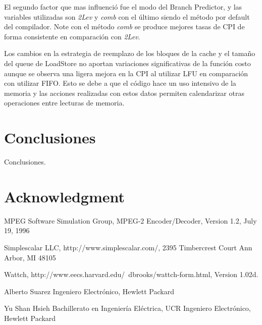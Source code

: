 \documentclass[journal]{IEEEtran}
\begin{document}
El segundo factor que mas influenci\'{o} fue el modo del Branch Predictor, y las variables utilizadas son \textit{2Lev} y \textit{comb} con el \'{u}ltimo siendo el m\'{e}todo por default del compilador. Note con el m\'{e}todo \textit{comb} se produce
mejores tasas de CPI de forma consistente en comparaci\'{o}n con \textit{2Lev}.

Los cambios en la estrategia de reemplazo de los bloques de la cache y el tamaño del queue de LoadStore no aportan variaciones significativas de la funci\'{o}n costo aunque se observa una ligera mejora en la CPI al utilizar LFU en comparaci\'{o}n con utilizar FIFO. Esto se debe a que el c\'{o}digo hace un uso intensivo de la memoria y las acciones realizadas con estos datos permiten calendarizar otras operaciones entre lecturas de memoria.


\section{Conclusiones}
Conclusiones.

\section*{Acknowledgment}

\begin{thebibliography}{1}
MPEG Software Simulation Group, MPEG-2 Encoder/Decoder, Version 1.2, July 19, 1996

Simplescalar LLC, http://www.simplescalar.com/, 2395 Timbercrest Court Ann Arbor, MI 48105

Wattch, http://www.eecs.harvard.edu/~dbrooks/wattch-form.html, Version 1.02d.

\end{thebibliography}

\begin{IEEEbiographynophoto}{Alberto Suarez}
Ingeniero Electr\'{o}nico, Hewlett Packard
\end{IEEEbiographynophoto}

\begin{IEEEbiographynophoto}{Yu Shan Hsieh}
Bachillerato en Ingenier\'{i}a El\'{e}ctrica, UCR
Ingeniero Electr\'{o}nico, Hewlett Packard
\end{IEEEbiographynophoto}
\end{document}
